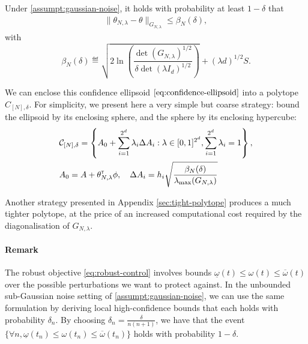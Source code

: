\documentclass{article}
\begin{document}
\begin{theorem}
\label{thm:confidence_ellipsoid}
Under \autoref{assumpt:gaussian-noise}, it holds with probability at least $1-\delta$ that
\begin{align}
    \label{eq:confidence-ellipsoid}
    \| \theta_{N,\lambda}  - \theta\|_{G_{N,\lambda}} \leq \beta_N(\delta),
\end{align}
with
\begin{equation}
	\label{eq:beta_n}
    \beta_N(\delta)\eqdef \sqrt{2\ln \left(\frac{\det(G_{N,\lambda})^{1/2}}{\delta\det(\lambda I_d)^{1/2}}\right)}
     + (\lambda d)^{1/2}S.
\end{equation}
\end{theorem}

We can enclose this confidence ellipsoid $\eqref{eq:confidence-ellipsoid}$ into a polytope $C_{[N],\delta}$. For simplicity, we present here a very simple but coarse strategy: bound the ellipsoid by its enclosing sphere, and the sphere by its enclosing hypercube:
\begin{align}
    \label{eq:polytope}
     &\mathcal{C}_{[N],\delta} = \left\{ A_{0}+\sum_{i=1}^{2^d}\lambda_{i}\Delta A_{i}: \lambda\in[0, 1]^{2^d},  \sum_{i=1}^{2^d}\lambda_{i}=1\right\},\\
     &A_0 = A + \theta_{N,\lambda}^{\mathsf{\scriptscriptstyle T}}\phi, \quad\Delta A_{i} = h_i \sqrt{\frac{\beta_N(\delta)}{\lambda_{\max}(G_{N,\lambda})}}
\end{align}

Another strategy presented in Appendix \ref{sec:tight-polytope} produces a much tighter polytope, at the price of an increased computational cost required by the diagonalisation of $G_{N,\lambda}$.

\paragraph{Remark} The robust objective \eqref{eq:robust-control} involves bounds $\underline{\omega}(t)\leq \omega(t) \leq \overline{\omega}(t)$ over the possible perturbations we want to protect against. In the unbounded sub-Gaussian noise setting of \autoref{assumpt:gaussian-noise}, we can use the same formulation by deriving local high-confidence bounds that each holds with probability $\delta_n$. By choosing $\delta_n = \frac{\delta}{n(n+1)}$, we have that the event $\{\forall n, \underline{\omega}(t_n) \leq \omega(t_n) \leq \overline{\omega}(t_n)\}$ holds with probability $1-\delta$.
\end{document}

